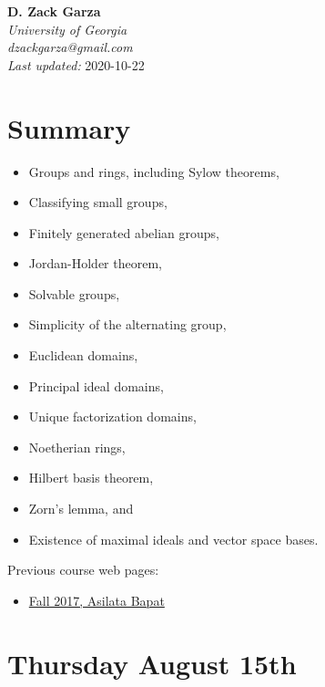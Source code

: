 \date{}
\maketitle
\begin{flushleft}
\textbf{D. Zack Garza} \\
\textit{University of Georgia} \\
\textit{dzackgarza@gmail.com} \\
{\tiny \textit{Last updated:} 2020-10-22 }
\end{flushleft}


\newpage
\tableofcontents

\hypertarget{summary}{%
\section{Summary}\label{summary}}

\begin{itemize}
\tightlist
\item
  Groups and rings, including Sylow theorems,
\item
  Classifying small groups,
\item
  Finitely generated abelian groups,
\item
  Jordan-Holder theorem,
\item
  Solvable groups,
\item
  Simplicity of the alternating group,
\item
  Euclidean domains,
\item
  Principal ideal domains,
\item
  Unique factorization domains,
\item
  Noetherian rings,
\item
  Hilbert basis theorem,
\item
  Zorn's lemma, and
\item
  Existence of maximal ideals and vector space bases.
\end{itemize}

Previous course web pages:

\begin{itemize}
\tightlist
\item
  \href{https://asilata.github.io/8000fall17/}{Fall 2017, Asilata Bapat}
\end{itemize}

\hypertarget{thursday-august-15th}{%
\section{Thursday August 15th}\label{thursday-august-15th}}

